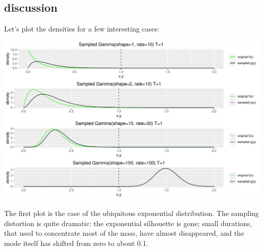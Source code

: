 \documentclass[]{article}
\newenvironment{Shaded}{\begin{snugshade}}{\end{snugshade}}
\newcommand{\CommentTok}[1]{\textcolor[rgb]{0.56,0.35,0.01}{\textit{#1}}}
\newcommand{\ControlFlowTok}[1]{\textcolor[rgb]{0.13,0.29,0.53}{\textbf{#1}}}
\newcommand{\DataTypeTok}[1]{\textcolor[rgb]{0.13,0.29,0.53}{#1}}
\newcommand{\FloatTok}[1]{\textcolor[rgb]{0.00,0.00,0.81}{#1}}
\newcommand{\KeywordTok}[1]{\textcolor[rgb]{0.13,0.29,0.53}{\textbf{#1}}}
\newcommand{\NormalTok}[1]{#1}
\newcommand{\OperatorTok}[1]{\textcolor[rgb]{0.81,0.36,0.00}{\textbf{#1}}}
\newcommand{\OtherTok}[1]{\textcolor[rgb]{0.56,0.35,0.01}{#1}}
\newcommand{\StringTok}[1]{\textcolor[rgb]{0.31,0.60,0.02}{#1}}
\begin{document}
\begin{Shaded}
\end{Shaded}

\hypertarget{discussion}{%
\subsection{discussion}\label{discussion}}

Let's plot the densities for a few interesting cases:

\begin{center}\includegraphics[width=1.0\textwidth]{sampling_event_duration_files/figure-latex/dsgamma_discussion-1} \end{center}

The first plot is the case of the ubiquitous exponential distribution.
The sampling distortion is quite dramatic: the exponential silhouette is
gone; small durations, that used to concentrate most of the mass, have
almost disappeared, and the mode itself has shifted from zero to about
0.1.
\end{document}
